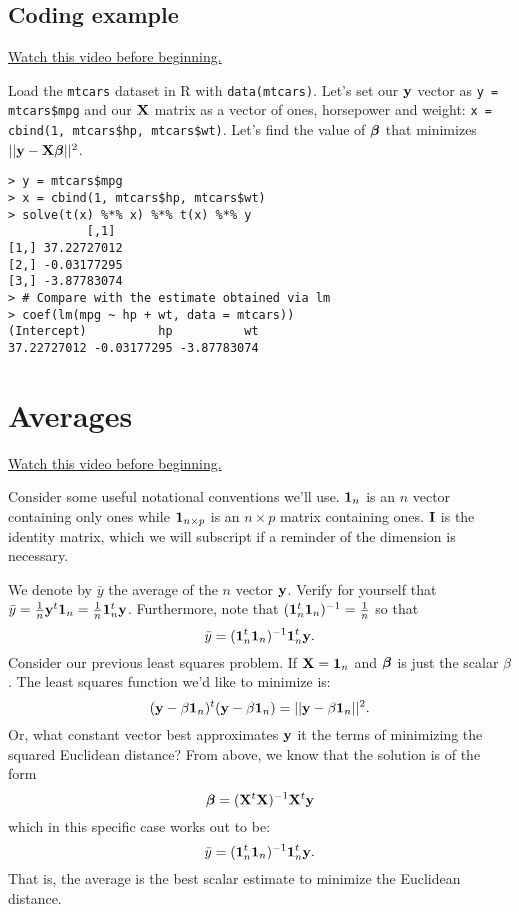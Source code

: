 \subsection{Coding example}

\href{https://www.youtube.com/watch?v=wW-4P7pl6E0&index=2&list=PLpl-gQkQivXhdgUCdaUQcdb31CRe8Mm2y}{Watch this video before beginning.}

Load the \texttt{mtcars} dataset in R with \texttt{data(mtcars)}.
Let's set our $\mathbf{y}$ vector as \texttt{y = mtcars\$mpg} and our
$\mathbf{X}$ matrix as a vector of ones, horsepower and weight:
\texttt{x = cbind(1, mtcars\$hp, mtcars\$wt)}. Let's find the
value of $\boldsymbol{\beta}$ that minimizes $|| \mathbf{y} - \mathbf{X} \boldsymbol{\beta}||^2$. 

\begin{verbatim}
> y = mtcars$mpg
> x = cbind(1, mtcars$hp, mtcars$wt)
> solve(t(x) %*% x) %*% t(x) %*% y
           [,1]
[1,] 37.22727012
[2,] -0.03177295
[3,] -3.87783074
> # Compare with the estimate obtained via lm
> coef(lm(mpg ~ hp + wt, data = mtcars))
(Intercept)          hp          wt 
37.22727012 -0.03177295 -3.87783074 
\end{verbatim}



\section{Averages}

\href{https://www.youtube.com/watch?v=GbcBLDS1VBw&index=3&list=PLpl-gQkQivXhdgUCdaUQcdb31CRe8Mm2y}{Watch this video before beginning.}

Consider some useful notational conventions we'll use. 
$\mathbf{1}_n$ is an  $n$ vector containing only ones while
$\mathbf{1}_{n\times p}$ is an $n\times p$ matrix containing ones.
$\mathbf{I}$ is the identity matrix, which we will subscript if a
reminder of the dimension is necessary.

We denote by $\bar y$ the average of the $n$ vector $\mathbf{y}$.
Verify for yourself that $\bar y = \frac{1}{n} \mathbf{y}^t \mathbf{1}_n = \frac{1}{n} \mathbf{1}_n^t \mathbf{y}$.
Furthermore, note that $(\mathbf{1}_n^t \mathbf{1}_n)^{-1} = \frac{1}{n}$ so that
$$
\bar y = (\mathbf{1}_n^t \mathbf{1}_n)^{-1} \mathbf{1}^t_n \mathbf{y}.
$$
Consider our previous least squares problem. If $\mathbf{X} = \mathbf{1}_n$ and $\boldsymbol{\beta}$ 
is just the scalar $\beta$. The least squares function we'd like to minimize
is:
$$
(\mathbf{y} - \beta \mathbf{1}_n)^t (\mathbf{y} - \beta \mathbf{1}_n) = ||\mathbf{y} - \beta \mathbf{1}_n||^2.
$$
Or, what constant vector best approximates $\mathbf{y}$ it the terms of minimizing the
squared Euclidean distance? From above, we know that the solution is of the form 
$$
\boldsymbol{\beta} = (\mathbf{X}^t \mathbf{X})^{-1} \mathbf{X}^t \mathbf{y}
$$
which in this specific case works out to be:
$$
\bar y = (\mathbf{1}_n^t \mathbf{1}_n)^{-1} \mathbf{1}^t_n \mathbf{y}.
$$
That is, the average is the best scalar estimate to minimize the 
Euclidean distance. 

